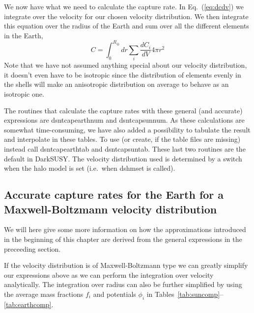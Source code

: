 \documentclass[a4paper,10pt,oneside]{book}
\newcommand{\code}[1]{\ft{#1}}
\newcommand{\ds}{{\sffamily DarkSUSY}}
\newcommand{\ft}[1]{\textsf{#1}}
\begin{document}
We now have what we need to calculate the capture rate. In
Eq.~(\ref{eq:dcdv}) we integrate over the velocity for our chosen
velocity distribution. We then integrate this equation over the radius
of the Earth and sum over all the different elements in the Earth, 
\begin{equation}
   C = \int_0^{R_\oplus} dr \sum_i \frac{dC_i}{dV} 4 \pi r^2
\end{equation}
Note that we have not assumed anything special about our velocity
distribution, it doesn't even have to be isotropic since the
distribution of elements evenly in the shells will make an anisotropic
distribution on average to behave as an isotropic one. 

The routines that calculate the capture rates with these general (and
accurate) expressions are \code{dsntcapearthnum} and
\code{dsntcapsunnum}. As these calculations are somewhat
time-consuming, we have also added a possibility to tabulate the
result and interpolate in these tables. To use (or create, if the
table files are missing) instead call \code{dsntcapearthtab} and
\code{dsntcapsuntab}. These last two routines are the default in
\ds. The velocity distribution used is determined by a switch when the
halo model is set (i.e.\ when \code{dshmset} is called).


\subsection{Accurate capture rates for the Earth for a
  Maxwell-Boltzmann velocity distribution}

We will here give some more information on how the approximations
introduced in the beginning of this chapter are derived from the
general expressions in the preceeding section.

If the velocity distribution is of Maxwell-Boltzmann type we can
greatly simplify our expressions above as we can perform the
integration over velocity analytically. The integration over radius
can also be further simplified by using the average mass fractions
$f_i$ and potentials $\phi_i$ in Tables~\ref{tab:suncomp}--\ref{tab:earthcomp}. 
\end{document}
